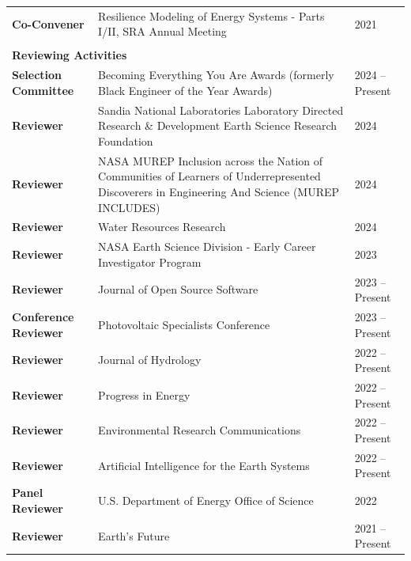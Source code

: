 \documentclass{article}[12pt]
\begin{document}
\begin{flushleft}
\begin{tabularx}{\textwidth}{lXl}
			\textbf{Co-Convener} & Resilience Modeling of Energy Systems - Parts I/II, \newline SRA Annual Meeting & 2021  \\
			\\
			\multicolumn{3}{l}{\large{\textbf{Reviewing Activities}}}\\
			\textbf{Selection Committee} & Becoming Everything You Are Awards (formerly Black Engineer of the Year Awards) & 2024 -- Present \\
			\textbf{Reviewer} & Sandia National Laboratories Laboratory Directed Research \& Development Earth Science Research Foundation & 2024 \\
			\textbf{Reviewer} & NASA MUREP Inclusion across the Nation of Communities of Learners of Underrepresented Discoverers in Engineering And Science \newline (MUREP INCLUDES) & 2024 \\
			\textbf{Reviewer} & Water Resources Research & 2024 \\
			\textbf{Reviewer} & NASA Earth Science Division - Early Career \newline Investigator Program & 2023 \\
			\textbf{Reviewer} & Journal of Open Source Software & 2023 -- Present \\
			\textbf{Conference Reviewer} & Photovoltaic Specialists Conference & 2023 -- Present \\
			\textbf{Reviewer} & Journal of Hydrology & 2022 -- Present \\
			\textbf{Reviewer} & Progress in Energy & 2022 -- Present \\
			\textbf{Reviewer} & Environmental Research Communications & 2022 -- Present \\
			\textbf{Reviewer} & Artificial Intelligence for the Earth Systems & 2022 -- Present \\
			\textbf{Panel Reviewer} & U.S. Department of Energy Office of Science & 2022 \\
			\textbf{Reviewer} & Earth's Future & 2021 -- Present \\

\end{tabularx}
\end{flushleft}
\end{document}

